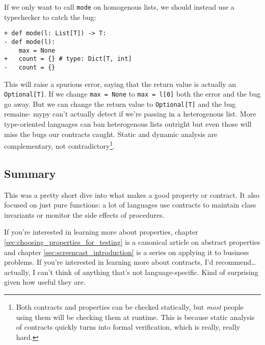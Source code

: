 If we only want to call \texttt{mode} on homogenous lists, we should
instead use a typechecker to catch the bug:

\begin{verbatim}
+ def mode(l: List[T]) -> T:
- def mode(l):
    max = None
+   count = {} # type: Dict[T, int]
-   count = {}
\end{verbatim}
This will raise a spurious error, saying that the return value is
actually an \texttt{Optional{[}T{]}}. If we change \texttt{max\ =\ None}
to \texttt{max\ =\ l{[}0{]}} both the error and the bug go away. But we
can change the return value to \texttt{Optional{[}T{]}} and the bug
remains- mypy can't actually detect if we're passing in a heterogenous
list. More type-oriented languages can ban heterogenous lists outright
but even those will miss the bugs our contracts caught. Static and
dynamic analysis are complementary, not
contradictory\footnote{Both contracts and properties can be checked statically, but \textit{most} people using them will be checking them at runtime. This is because static analysis of contracts quickly turns into formal verification, which is really, really hard. }.

\hypertarget{summary}{%
\subsection{Summary}\label{summary}}

This was a pretty short dive into what makes a good property or
contract. It also focused on just pure functions: a lot of languages use
contracts to maintain class invariants or monitor the side effects of
procedures.

If you're interested in learning more about properties,
chapter \ref{sec:choosing_properties_for_testing}
is a canonical article on abstract properties and chapter \ref{sec:screencast_introduction}
is a series on applying it to business problems. If you're interested in
learning more about contracts, I'd recommend\ldots{} actually, I can't
think of anything that's not language-specific. Kind of surprising given
how useful they are.



